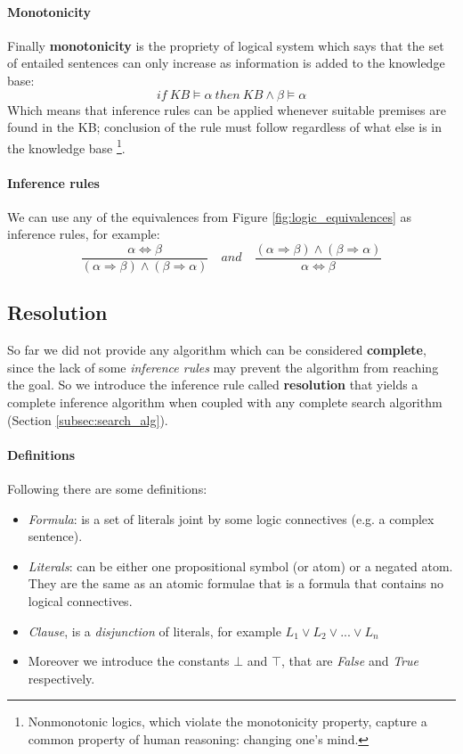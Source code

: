\documentclass[10pt,a4paper]{article}
\begin{document}
\paragraph{Monotonicity}
Finally \textbf{monotonicity} is the propriety of logical system  which says that the set of entailed sentences can only increase as information is added to the knowledge base:
\[if\ KB\models \alpha\ then \ KB\wedge\beta\models\alpha\]
Which means that inference rules can be applied whenever suitable premises are found in the KB; conclusion of the rule must follow regardless of what else is in the knowledge base \footnote{Nonmonotonic logics, which violate the monotonicity property, capture a common property of human reasoning: changing one's mind.}.

\paragraph{Inference rules}
We can use any of the equivalences from Figure \ref{fig:logic_equivalences} as inference rules, for example:
\[\frac{\alpha \Leftrightarrow \beta }{(\alpha \Rightarrow \beta)\wedge(\beta\Rightarrow\alpha)}\quad and\quad \frac{(\alpha \Rightarrow \beta)\wedge(\beta\Rightarrow\alpha)}{\alpha \Leftrightarrow \beta }\]

\subsection{Resolution}
\label{sec:resolution}
So far we did not provide any algorithm which can be considered \textbf{complete}, since the lack of some \textit{inference rules} may prevent the algorithm from reaching the goal. So we introduce the inference rule called \textbf{resolution} that yields a complete inference algorithm when coupled with any complete search algorithm (Section \ref{subsec:search_alg}).

\paragraph{Definitions}
Following there are some definitions:
\begin{itemize}
\item \textit{Formula}: is a set of literals joint by some logic connectives (e.g. a complex sentence).
\item \textit{Literals}: can be either one propositional symbol (or atom) or a negated atom. They are the same as an atomic formulae that is a formula that contains no logical connectives.
\item \textit{Clause}, is a \textit{disjunction} of literals, for example $L_1\vee L_2\vee...\vee L_n$
\item Moreover we introduce the constants $\bot$ and $\top$, that are \textit{False} and \textit{True} respectively.

\end{itemize}
\end{document}
